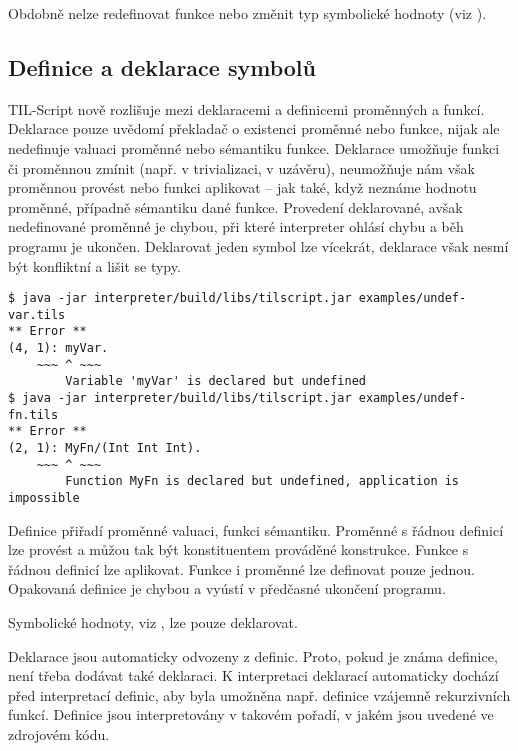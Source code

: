 Obdobně nelze redefinovat funkce nebo změnit typ symbolické hodnoty (viz ).

\subsection{Definice a deklarace symbolů}

TIL-Script nově rozlišuje mezi deklaracemi a definicemi proměnných a funkcí. Deklarace pouze
uvědomí překladač o existenci proměnné nebo funkce, nijak ale nedefinuje valuaci proměnné nebo
sémantiku funkce. Deklarace umožňuje funkci či proměnnou zmínit (např. v trivializaci, v uzávěru),
neumožňuje nám však proměnnou provést nebo funkci aplikovat -- jak také, když neznáme hodnotu
proměnné, případně sémantiku dané funkce. Provedení deklarované, avšak nedefinované proměnné
je chybou, při které interpreter ohlásí chybu a běh programu je ukončen. Deklarovat jeden symbol
lze vícekrát, deklarace však nesmí být konfliktní a lišit se typy.

\begin{lstlisting}[caption={Hlášení chyby při chybějící definici}]
$ java -jar interpreter/build/libs/tilscript.jar examples/undef-var.tils
** Error **
(4, 1): myVar.
    ~~~ ^ ~~~
        Variable 'myVar' is declared but undefined
$ java -jar interpreter/build/libs/tilscript.jar examples/undef-fn.tils
** Error **
(2, 1): MyFn/(Int Int Int).
    ~~~ ^ ~~~
        Function MyFn is declared but undefined, application is impossible
\end{lstlisting}

Definice přiřadí proměnné valuaci, funkci sémantiku. Proměnné s řádnou definicí lze provést
a můžou tak být konstituentem prováděné konstrukce. Funkce s řádnou definicí lze aplikovat. Funkce
i proměnné lze definovat pouze jednou. Opakovaná definice je chybou a vyústí v předčasné ukončení
programu.

Symbolické hodnoty, viz , lze pouze deklarovat.

Deklarace jsou automaticky odvozeny z definic. Proto, pokud je známa definice, není třeba dodávat
také deklaraci. K interpretaci deklarací automaticky dochází před interpretací definic, aby byla
umožněna např. definice vzájemně rekurzivních funkcí. Definice jsou interpretovány v takovém
pořadí, v jakém jsou uvedené ve zdrojovém kódu.

